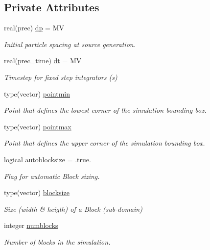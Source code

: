 \subsection*{Private Attributes}
\begin{DoxyCompactItemize}
\item 
real(prec) \mbox{\hyperlink{structsimulation__globals__mod_1_1simdefs__t_af730c363daf57cdb66206b7cc7e3d8ff}{dp}} = MV
\begin{DoxyCompactList}\small\item\em Initial particle spacing at source generation. \end{DoxyCompactList}\item 
real(prec\+\_\+time) \mbox{\hyperlink{structsimulation__globals__mod_1_1simdefs__t_acc8df5cd09283215deb732d97b44f1dc}{dt}} = MV
\begin{DoxyCompactList}\small\item\em Timestep for fixed step integrators (s) \end{DoxyCompactList}\item 
type(vector) \mbox{\hyperlink{structsimulation__globals__mod_1_1simdefs__t_af3a5fb325c955840515f199c8be30aa7}{pointmin}}
\begin{DoxyCompactList}\small\item\em Point that defines the lowest corner of the simulation bounding box. \end{DoxyCompactList}\item 
type(vector) \mbox{\hyperlink{structsimulation__globals__mod_1_1simdefs__t_a0437ce61f2882028c5e3ca0212aeaf24}{pointmax}}
\begin{DoxyCompactList}\small\item\em Point that defines the upper corner of the simulation bounding box. \end{DoxyCompactList}\item 
logical \mbox{\hyperlink{structsimulation__globals__mod_1_1simdefs__t_a3ff72d630a17daa1ca1494e67bc6d087}{autoblocksize}} = .true.
\begin{DoxyCompactList}\small\item\em Flag for automatic Block sizing. \end{DoxyCompactList}\item 
type(vector) \mbox{\hyperlink{structsimulation__globals__mod_1_1simdefs__t_a7ed40e8b9c4062d6e461b6187c3115b1}{blocksize}}
\begin{DoxyCompactList}\small\item\em Size (width \& heigth) of a Block (sub-\/domain) \end{DoxyCompactList}\item 
integer \mbox{\hyperlink{structsimulation__globals__mod_1_1simdefs__t_a6b7497df8a36fe045f2096963db3bdde}{numblocks}}
\begin{DoxyCompactList}\small\item\em Number of blocks in the simulation. \end{DoxyCompactList}\end{DoxyCompactItemize}


